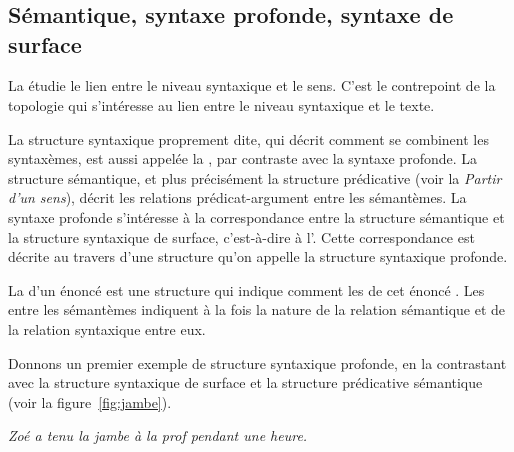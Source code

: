 \chapter{}\label{sec:13}

\section{Sémantique, syntaxe profonde, syntaxe de surface}

La  étudie le lien entre le niveau syntaxique et le sens. C’est le contrepoint de la topologie qui s’intéresse au lien entre le niveau syntaxique et le texte.

La structure syntaxique proprement dite, qui décrit comment se combinent les syntaxèmes, est aussi appelée la , par contraste avec la syntaxe profonde. La structure sémantique, et plus précisément la structure prédicative (voir la  \textit{Partir d’un sens}), décrit les relations prédicat-argument entre les sémantèmes. La syntaxe profonde s’intéresse à la correspondance entre la structure sémantique et la structure syntaxique de surface, c’est-à-dire à l’. Cette correspondance est décrite au travers d’une structure qu’on appelle la structure syntaxique profonde.

{La  d’un énoncé est une structure qui indique comment les  de cet énoncé . Les  entre les sémantèmes indiquent à la fois la nature de la relation sémantique et de la relation syntaxique entre eux.}

Donnons un premier exemple de structure syntaxique profonde, en la contrastant avec la structure syntaxique de surface et la structure prédicative sémantique (voir la figure~\ref{fig:jambe}). 

\ea\label{ex:jambe} \textit{Zoé a tenu la jambe à la prof pendant une heure.}\z

